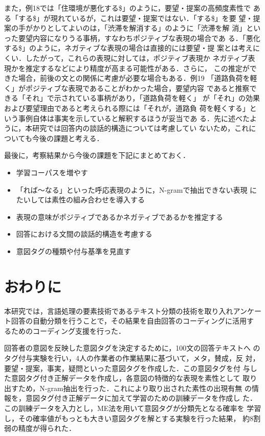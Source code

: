 また，例18では「住環境が悪化する\$」のように，要望・提案の高頻度素性で
ある「する\$」が現れているが，これは要望・提案ではない．「する\$」を要
望・提案の手がかりとしてよいのは，「渋滞を解消する」のように「渋滞を解
消」といった要望内容になりうる事柄，すなわちポジティブな表現の場合であ
る．「悪化する\$」のように，ネガティブな表現の場合は直接的には要望・提
案とは考えにくい．したがって，これらの表現に対しては，ポジティブ表現か
ネガティブ表現かを推定するなどにより精度が高まる可能性がある．さらに，
この推定ができた場合，前後の文との関係に考慮が必要な場合もある．例19
「道路負荷を軽く」がポジティブな表現であることがわかった場合，要望内容
であると推察できる「それ」で示されている事柄があり，「道路負荷を軽く」
が「それ」の効果および要望理由であると考えられる際には「それが，道路負
荷を軽くする」という事例自体は事実を示していると解釈するほうが妥当であ
る．先に述べたように，本研究では回答内の談話的構造については考慮してい
ないため，これについても今後の課題と考える．

最後に，考察結果から今後の課題を下記にまとめておく．

\begin{itemize}
\item 学習コーパスを増やす
\item 「れば〜なる」といった呼応表現のように，N-gramで抽出できない表現
にたいしては素性の組み合わせを導入する
\item 表現の意味がポジティブであるかネガティブであるかを推定する
\item 回答における文間の談話的構造を考慮する
\item 意図タグの種類や付与基準を見直す
\end{itemize}

\section{おわりに}

本研究では，言語処理の要素技術であるテキスト分類の技術を取り入れアンケー
ト回答の自動分類を行うことで，その結果を自由回答のコーディングに活用す
るためのコーディング支援を行った．

回答者の意図を反映した意図タグを決定するために，100文の回答テキストへ
のタグ付与実験を行い，4人の作業者の作業結果に基づいて，メタ，賛成，反
対，要望・提案，事実，疑問といった意図タグを作成した．この意図タグを付
与した意図タグ付き正解データを作成し，各意図の特徴的な表現を素性として
取り出すため，N-gram抽出を行った．これにより取り出された素性の出現有無
の情報を，意図タグ付き正解データに加えて学習のための訓練データを作成し
た．この訓練データを入力とし，ME法を用いて意図タグが分類先となる確率を
学習し，その確率値がもっとも大きい意図タグを解とする実験を行った結果，
約8割弱の精度が得られた．

